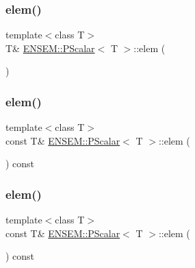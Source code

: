 \mbox{\label{classENSEM_1_1PScalar_aac65f47beae4fa376f101587344c1589}} 
\subsubsection{\texorpdfstring{elem()}{elem()}\hspace{0.1cm}{\footnotesize\ttfamily [3/6]}}
{\footnotesize\ttfamily template$<$class T$>$ \\
T\& \mbox{\hyperlink{classENSEM_1_1PScalar}{E\+N\+S\+E\+M\+::\+P\+Scalar}}$<$ T $>$\+::elem (\begin{DoxyParamCaption}{ }\end{DoxyParamCaption})\hspace{0.3cm}{\ttfamily [inline]}}

\mbox{\label{classENSEM_1_1PScalar_ac20d84af6de415de7ad63292ad278542}} 
\subsubsection{\texorpdfstring{elem()}{elem()}\hspace{0.1cm}{\footnotesize\ttfamily [4/6]}}
{\footnotesize\ttfamily template$<$class T$>$ \\
const T\& \mbox{\hyperlink{classENSEM_1_1PScalar}{E\+N\+S\+E\+M\+::\+P\+Scalar}}$<$ T $>$\+::elem (\begin{DoxyParamCaption}{ }\end{DoxyParamCaption}) const\hspace{0.3cm}{\ttfamily [inline]}}

\mbox{\label{classENSEM_1_1PScalar_ac20d84af6de415de7ad63292ad278542}} 
\subsubsection{\texorpdfstring{elem()}{elem()}\hspace{0.1cm}{\footnotesize\ttfamily [5/6]}}
{\footnotesize\ttfamily template$<$class T$>$ \\
const T\& \mbox{\hyperlink{classENSEM_1_1PScalar}{E\+N\+S\+E\+M\+::\+P\+Scalar}}$<$ T $>$\+::elem (\begin{DoxyParamCaption}{ }\end{DoxyParamCaption}) const\hspace{0.3cm}{\ttfamily [inline]}}

